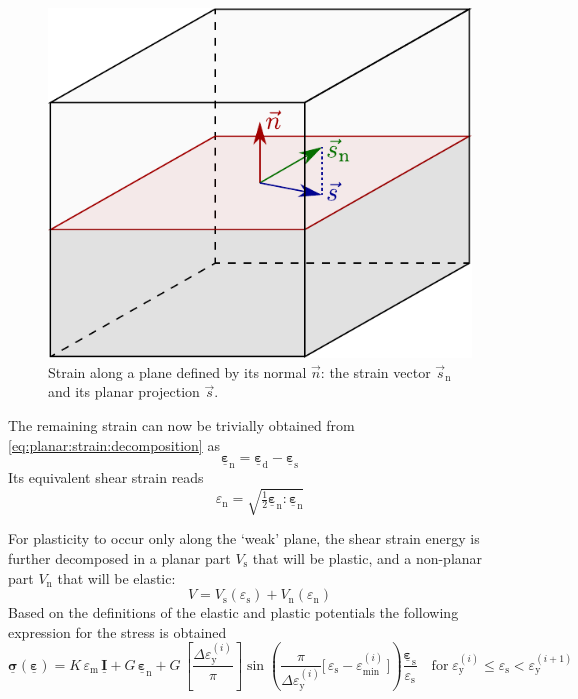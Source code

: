 \documentclass[fleqn]{goose-article}
\newcommand\T[1]{\underline{\bm{{#1}}}}
\begin{document}
\begin{figure}[htp]
    \centering
    \includegraphics[width=.35\textwidth]{figures/strain-vector-planar}
    \caption{
        Strain along a plane defined by its normal $\vec{n}$:
        the strain vector $\vec{s}_\mathrm{n}$ and its planar projection $\vec{s}$.}
    \label{fig:strain-vector-planar}
\end{figure}

The remaining strain can now be trivially obtained from \cref{eq:planar:strain:decomposition} as
\begin{equation}
    \T{\varepsilon}_\mathrm{n} = \T{\varepsilon}_\mathrm{d} - \T{\varepsilon}_\mathrm{s}
\end{equation}
Its equivalent shear strain reads
\begin{equation}
    \varepsilon_\mathrm{n}
    = \sqrt{\tfrac{1}{2} \T{\varepsilon}_\mathrm{n} : \T{\varepsilon}_\mathrm{n}}
\end{equation}

For plasticity to occur only along the `weak' plane, the shear strain energy is further
decomposed in a planar part $V_\mathrm{s}$ that will be plastic,
and a non-planar part $V_\mathrm{n}$ that will be elastic:
\begin{equation}
    V
    =
    V_\mathrm{s} ( \varepsilon_\mathrm{s} )
    +
    V_\mathrm{n} ( \varepsilon_\mathrm{n} )
\end{equation}
Based on the definitions of the elastic and plastic potentials the
following expression for the stress is obtained
\begin{equation}
    \T{\sigma} ( \T{\varepsilon} )
    =
    K \, \varepsilon_\mathrm{m} \, \T{I}
    +
    G \, \T{\varepsilon}_\mathrm{n}
    +
    G \,
    \left[ \frac{\Delta \varepsilon_\mathrm{y}^{(i)}}{\pi} \right]
    \sin \left(
        \frac{ \pi }{ \Delta \varepsilon_\mathrm{y}^{(i)} }
        \Big[\, \varepsilon_\mathrm{s} - \varepsilon_\mathrm{min}^{(i)} \,\Big]
    \right)
    \frac{\T{\varepsilon}_\mathrm{s}}{\varepsilon_\mathrm{s}}
    \quad
    \mathrm{for}
    \;
    \varepsilon_\mathrm{y}^{(i)} \leq \varepsilon_\mathrm{s} < \varepsilon_\mathrm{y}^{(i+1)}
\end{equation}
\end{document}

